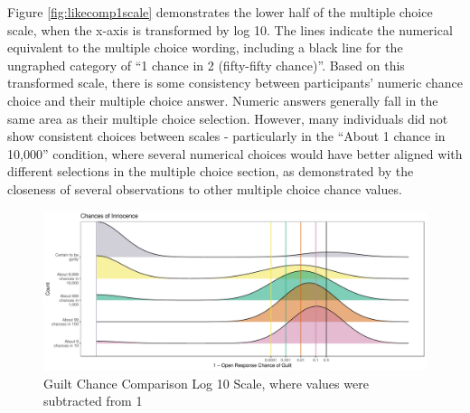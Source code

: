 \documentclass[print]{nuthesis}
\begin{document}
Figure \ref{fig:likecomp1scale} demonstrates the lower half of the multiple choice scale, when the x-axis is transformed by log 10.
The lines indicate the numerical equivalent to the multiple choice wording, including a black line for the ungraphed category of ``1 chance in 2 (fifty-fifty chance)''.
Based on this transformed scale, there is some consistency between participants' numeric chance choice and their multiple choice answer.
Numeric answers generally fall in the same area as their multiple choice selection.
However, many individuals did not show consistent choices between scales - particularly in the ``About 1 chance in 10,000'' condition, where several numerical choices would have better aligned with different selections in the multiple choice section, as demonstrated by the closeness of several observations to other multiple choice chance values.

\begin{figure}

{\centering \includegraphics[width=\linewidth]{thesis_files/figure-latex/likecomp1scalerev-1} 

}

\caption{Guilt Chance Comparison Log 10 Scale, where values were subtracted from 1}\label{fig:likecomp1scalerev}
\end{figure}
\end{document}
